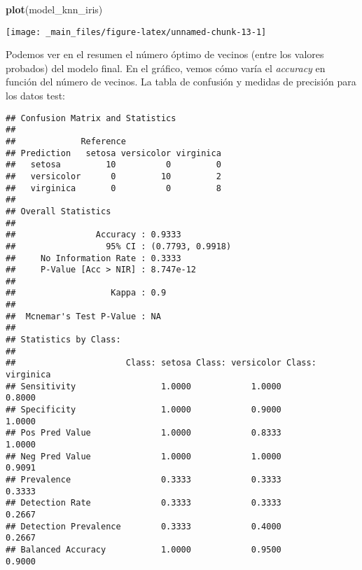 \documentclass[]{book}
\newenvironment{Shaded}{\begin{snugshade}}{\end{snugshade}}
\newcommand{\CommentTok}[1]{\textcolor[rgb]{0.56,0.35,0.01}{\textit{#1}}}
\newcommand{\DataTypeTok}[1]{\textcolor[rgb]{0.13,0.29,0.53}{#1}}
\newcommand{\KeywordTok}[1]{\textcolor[rgb]{0.13,0.29,0.53}{\textbf{#1}}}
\newcommand{\NormalTok}[1]{#1}
\newcommand{\OperatorTok}[1]{\textcolor[rgb]{0.81,0.36,0.00}{\textbf{#1}}}
\newcommand{\StringTok}[1]{\textcolor[rgb]{0.31,0.60,0.02}{#1}}
\begin{document}
\begin{Shaded}
\begin{Highlighting}[]
\KeywordTok{plot}\NormalTok{(model_knn_iris)}
\end{Highlighting}
\end{Shaded}

\begin{center}\texttt{[image: \_main\_files/figure-latex/unnamed-chunk-13-1]} \end{center}

Podemos ver en el resumen el número óptimo de vecinos (entre los valores probados) del modelo final. En el gráfico, vemos cómo varía el \emph{accuracy} en función del número de vecinos. La tabla de confusión y medidas de precisión para los datos test:

\begin{Shaded}
\end{Shaded}

\begin{verbatim}
## Confusion Matrix and Statistics
## 
##             Reference
## Prediction   setosa versicolor virginica
##   setosa         10          0         0
##   versicolor      0         10         2
##   virginica       0          0         8
## 
## Overall Statistics
##                                           
##                Accuracy : 0.9333          
##                  95% CI : (0.7793, 0.9918)
##     No Information Rate : 0.3333          
##     P-Value [Acc > NIR] : 8.747e-12       
##                                           
##                   Kappa : 0.9             
##                                           
##  Mcnemar's Test P-Value : NA              
## 
## Statistics by Class:
## 
##                      Class: setosa Class: versicolor Class: virginica
## Sensitivity                 1.0000            1.0000           0.8000
## Specificity                 1.0000            0.9000           1.0000
## Pos Pred Value              1.0000            0.8333           1.0000
## Neg Pred Value              1.0000            1.0000           0.9091
## Prevalence                  0.3333            0.3333           0.3333
## Detection Rate              0.3333            0.3333           0.2667
## Detection Prevalence        0.3333            0.4000           0.2667
## Balanced Accuracy           1.0000            0.9500           0.9000
\end{verbatim}
\end{document}
